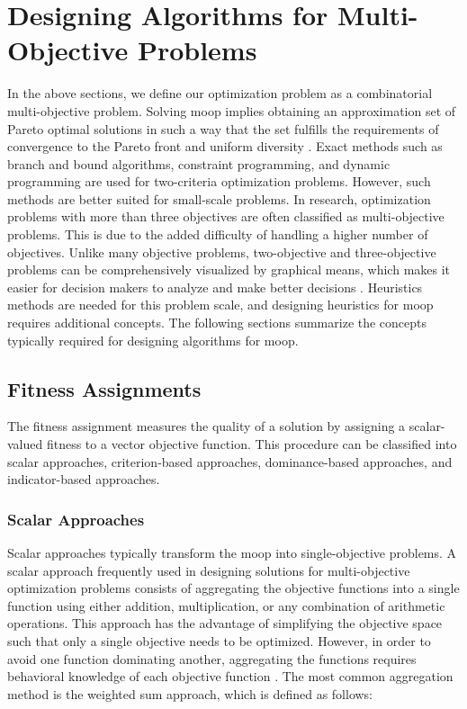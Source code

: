 \section{Designing Algorithms for Multi-Objective Problems}
In the above sections, we define our optimization problem as a combinatorial multi-objective problem. Solving \gls{moop} implies obtaining an approximation set of Pareto optimal solutions in such a way that the set fulfills the requirements of convergence to the Pareto front and uniform diversity  \parencite{Talbi2009Metaheuristics:Implementation}. Exact methods such as branch and bound algorithms, constraint programming, and dynamic programming are used for two-criteria optimization problems. However, such methods are better suited for small-scale problems. In research, optimization problems with more than three objectives are often classified as multi-objective problems. This is due to the added difficulty of handling a higher number of objectives. Unlike many objective problems, two-objective and three-objective problems can be comprehensively visualized by graphical means, which makes it easier for decision makers to analyze and make better decisions \parencite{Deb2013AnConstraints}. Heuristics methods are needed for this problem scale, and designing heuristics for \gls{moop} requires additional concepts. The following sections summarize the concepts typically required for designing algorithms for \gls{moop}.


\subsection{Fitness Assignments}
The fitness assignment measures the quality of a solution by assigning a scalar-valued fitness to a vector objective function. This procedure can be classified into scalar approaches, criterion-based approaches, dominance-based approaches, and indicator-based approaches.

\subsubsection{Scalar Approaches}
Scalar approaches typically transform the \gls{moop} into single-objective problems. A scalar approach frequently used in designing solutions for multi-objective optimization problems consists of aggregating the objective functions into a single function using either addition, multiplication, or any combination of arithmetic operations. This approach has the advantage of simplifying the objective space such that only a single objective needs to be optimized. However, in order to avoid one function dominating another, aggregating the functions requires behavioral knowledge of each objective function \parencite{CoelloCoello1999ATechniquesc}. The most common aggregation method is the weighted sum approach, which is defined as follows:

